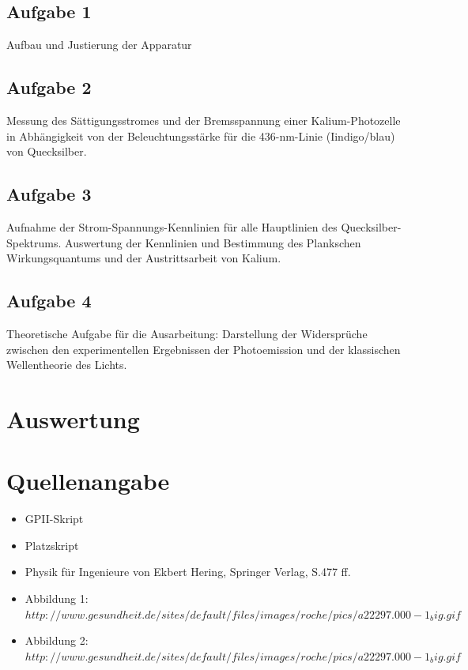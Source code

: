 \documentclass{article}
\begin{document}
\subsection{Aufgabe 1}
Aufbau und Justierung der Apparatur

\subsection{Aufgabe 2}
Messung des Sättigungsstromes und der Bremsspannung einer Kalium-Photozelle in Abhängigkeit von der Beleuchtungsstärke für die 436-nm-Linie (Iindigo/blau) von Quecksilber.

\subsection{Aufgabe 3}
Aufnahme der Strom-Spannungs-Kennlinien für alle Hauptlinien des Quecksilber-Spektrums. Auswertung der Kennlinien und Bestimmung des Plankschen Wirkungsquantums und der Austrittsarbeit von Kalium.

\subsection{Aufgabe 4}
Theoretische Aufgabe für die Ausarbeitung: Darstellung der Widersprüche zwischen den experimentellen Ergebnissen der Photoemission und der klassischen Wellentheorie des Lichts.

\newpage
\section{Auswertung}














\section{Quellenangabe}
\begin{itemize}
\item GPII-Skript
\item Platzskript
\item Physik für Ingenieure von Ekbert Hering, Springer Verlag, S.477 ff.
\item Abbildung 1: \(http://www.gesundheit.de/sites/default/files/images/roche/pics/a22297.000-1_big.gif\)
\item Abbildung 2:  \(http://www.gesundheit.de/sites/default/files/images/roche/pics/a22297.000-1_big.gif\)
\end{itemize}
\end{document}
